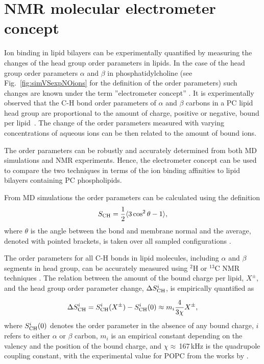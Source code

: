 

\section{NMR molecular electrometer concept} \label{section:electrometer} 

Ion binding in lipid bilayers can be experimentally quantified
by measuring the changes of the head group order parameters in lipids.
In the case of the head group order parameters $\alpha$ and $\beta$ in phosphatidylcholine
(see Fig.~\ref{fig:simVSexpNOions} for the definition of the order parameters)
such changes are known under the term ''electrometer concept'' \citep{seelig87,catte16, ollila16}. 
It is experimentally observed that the C-H bond
order parameters of $\alpha$ and $\beta$ carbons in a PC lipid head group
are proportional to the amount of charge, positive or negative, bound per lipid~\citep{seelig87}.
The change of the order parameters measured with varying concentrations of aqueous ions 
can be then related to the amount of bound ions.

The order parameters can be robustly and accurately determined from both MD simulations and  NMR experiments. 
Hence, the electrometer concept can be used to compare the two techniques
in terms of the ion binding affinities to lipid bilayers containing PC phospholipids.  \citep{catte16,ollila16} 

From MD simulations the order parameters can be calculated using the definition
\begin{equation}\label{OP} 
S_{\rm CH}=\frac{1}{2}\langle 3\cos^2\theta -1 \rangle, 
\end{equation} 
where $\theta$ is the angle between the  bond and membrane
normal and the average, denoted with pointed brackets, is taken over all sampled configurations \citep{ollila16}.

The order parameters for all C-H bonds in lipid molecules, including
$\alpha$ and $\beta$ segments in head group, can be accurately measured
using $^2$H or $^{13}$C NMR techniques \citep{ollila16}. 
The relation between the amount of the bound charge per lipid,  $X^\pm$, and
the head group order parameter change, $\Delta S_{\rm{CH}}^{i}$,
is empirically quantified as~\citep{seelig87,ferreira16}

\begin{equation}\label{OPchangeEQ} 
\Delta S_{\rm{CH}}^{i}= S_{\rm{CH}}^{i}(X^\pm)-S_{\rm{CH}}^{i}(0) \approx m_i \frac{4 }{3\chi}X^\pm, 
\end{equation} 
where $S_{\rm{CH}}^{i}(0)$ denotes the order parameter in the absence of any bound charge,
$i$ refers to either $\alpha$ or $\beta$ carbon,
$m_i$ is an empirical constant depending on the valency and the position of the bound charge,
and $\chi \approx$\,167\,kHz is the quadrupole coupling constant, 
with the experimental value for POPC from the works by \citet{seelig77,Davis83}.


